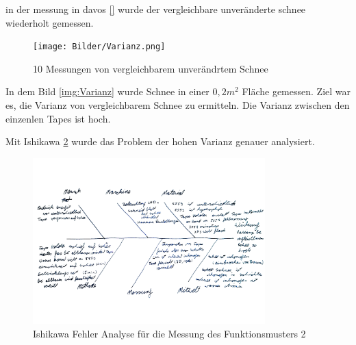 in der messung in davos \ref{} wurde der vergleichbare unveränderte schnee wiederholt gemessen. 

\begin{figure}
    \centering
    \texttt{[image: Bilder/Varianz.png]}
    \caption{10 Messungen von vergleichbarem unverändrtem Schnee}
    \label{fig:Varianz}
\end{figure}


In dem Bild \ref{img:Varianz} wurde Schnee in einer $0,2 m^2$ Fläche gemessen. Ziel war es, die Varianz von vergleichbarem Schnee zu ermitteln. Die Varianz zwischen den einzenlen Tapes ist hoch.


Mit Ishikawa \ref{fig:IshikwaDavos} wurde das Problem der hohen Varianz genauer analysiert.



\begin{figure}
    \centering
    \includegraphics[width=0.8\textwidth]{Bilder/IshikawaDavos.jpg}
    \caption{Ishikawa Fehler Analyse für die Messung des Funktionsmusters 2}
    \label{fig:IshikwaDavos}
\end{figure}





